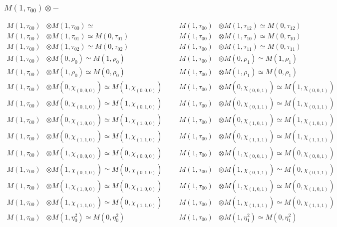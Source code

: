 \subsubsection{$ M(1,\tau_{00})\otimes -$}
\begin{align*}
M(1,\tau_{00}) &\otimes M(1,\tau_{00}) \simeq  &&& M(1,\tau_{00}) &\otimes M(1,\tau_{12}) \simeq M(0,\tau_{12})\\
M(1,\tau_{00}) &\otimes M(1,\tau_{01}) \simeq M(0,\tau_{01}) &&& M(1,\tau_{00}) &\otimes M(1,\tau_{10}) \simeq M(0,\tau_{10})\\
M(1,\tau_{00}) &\otimes M(1,\tau_{02}) \simeq M(0,\tau_{02}) &&& M(1,\tau_{00}) &\otimes M(1,\tau_{11}) \simeq M(0,\tau_{11})\\
M(1,\tau_{00}) &\otimes M(0,\rho_{0}) \simeq M(1,\rho_{0}) &&& M(1,\tau_{00}) &\otimes M(0,\rho_{1}) \simeq M(1,\rho_{1})\\
M(1,\tau_{00}) &\otimes M(1,\rho_{0}) \simeq M(0,\rho_{0}) &&& M(1,\tau_{00}) &\otimes M(1,\rho_{1}) \simeq M(0,\rho_{1})\\
M(1,\tau_{00}) &\otimes M(0,\chi_{(0,0,0)}) \simeq M(1,\chi_{(0,0,0)}) &&& M(1,\tau_{00}) &\otimes M(0,\chi_{(0,0,1)}) \simeq M(1,\chi_{(0,0,1)})\\
M(1,\tau_{00}) &\otimes M(0,\chi_{(0,1,0)}) \simeq M(1,\chi_{(0,1,0)}) &&& M(1,\tau_{00}) &\otimes M(0,\chi_{(0,1,1)}) \simeq M(1,\chi_{(0,1,1)})\\
M(1,\tau_{00}) &\otimes M(0,\chi_{(1,0,0)}) \simeq M(1,\chi_{(1,0,0)}) &&& M(1,\tau_{00}) &\otimes M(0,\chi_{(1,0,1)}) \simeq M(1,\chi_{(1,0,1)})\\
M(1,\tau_{00}) &\otimes M(0,\chi_{(1,1,0)}) \simeq M(1,\chi_{(1,1,0)}) &&& M(1,\tau_{00}) &\otimes M(0,\chi_{(1,1,1)}) \simeq M(1,\chi_{(1,1,1)})\\
M(1,\tau_{00}) &\otimes M(1,\chi_{(0,0,0)}) \simeq M(0,\chi_{(0,0,0)}) &&& M(1,\tau_{00}) &\otimes M(1,\chi_{(0,0,1)}) \simeq M(0,\chi_{(0,0,1)})\\
M(1,\tau_{00}) &\otimes M(1,\chi_{(0,1,0)}) \simeq M(0,\chi_{(0,1,0)}) &&& M(1,\tau_{00}) &\otimes M(1,\chi_{(0,1,1)}) \simeq M(0,\chi_{(0,1,1)})\\
M(1,\tau_{00}) &\otimes M(1,\chi_{(1,0,0)}) \simeq M(0,\chi_{(1,0,0)}) &&& M(1,\tau_{00}) &\otimes M(1,\chi_{(1,0,1)}) \simeq M(0,\chi_{(1,0,1)})\\
M(1,\tau_{00}) &\otimes M(1,\chi_{(1,1,0)}) \simeq M(0,\chi_{(1,1,0)}) &&& M(1,\tau_{00}) &\otimes M(1,\chi_{(1,1,1)}) \simeq M(0,\chi_{(1,1,1)})\\
M(1,\tau_{00}) &\otimes M(1,\eta^{2}_{0}) \simeq M(0,\eta^{2}_{0}) &&& M(1,\tau_{00}) &\otimes M(1,\eta^{2}_{1}) \simeq M(0,\eta^{2}_{1})\\

\end{align*}

